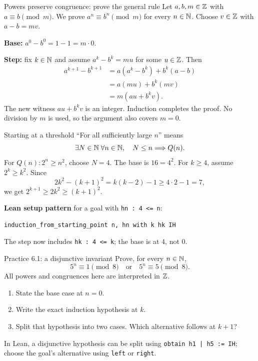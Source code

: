 \begin{frame}{Powers preserve congruence: prove the general rule}
Let $a,b,m\in\mathbb{Z}$ with $a\equiv b\pmod m$. We prove
$a^n\equiv b^n\pmod m$ for every $n\in\mathbb{N}$.
Choose $v\in\mathbb{Z}$ with $a-b=mv$.

\textbf{Base:} $a^0-b^0=1-1=m\cdot0$.

\textbf{Step:} fix $k\in\mathbb{N}$ and assume $a^k-b^k=mu$ for some $u\in\mathbb{Z}$.
Then
\[
\begin{aligned}
 a^{k+1}-b^{k+1}
 &=a(a^k-b^k)+b^k(a-b)\\
 &=a(mu)+b^k(mv)\\
 &=m(au+b^kv).
\end{aligned}
\]
The new witness $au+b^kv$ is an integer. Induction completes the proof.
No division by $m$ is used, so the argument also covers $m=0$.
\end{frame}

\begin{frame}[fragile]{Starting at a threshold}
``For all sufficiently large $n$'' means
\[
 \exists N\in\mathbb{N}\;\forall n\in\mathbb{N},\quad N\le n\Longrightarrow Q(n).
\]
For $Q(n): 2^n\ge n^2$, choose $N=4$. The base is $16=4^2$.
For $k\ge4$, assume $2^k\ge k^2$. Since
\[
 2k^2-(k+1)^2=k(k-2)-1\ge4\cdot2-1=7,
\]
we get $2^{k+1}\ge2k^2\ge(k+1)^2$.

\textbf{Lean setup pattern} for a goal with \texttt{hn : 4 <= n}:
\begin{lstlisting}
induction_from_starting_point n, hn with k hk IH
\end{lstlisting}
The step now includes \texttt{hk : 4 <= k}; the base is at $4$, not $0$.
\end{frame}

\begin{frame}{Practice 6.1: a disjunctive invariant}
Prove, for every $n\in\mathbb{N}$,
\[
 5^n\equiv1\pmod8\quad\text{or}\quad5^n\equiv5\pmod8.
\]
All powers and congruences here are interpreted in $\mathbb{Z}$.
\begin{enumerate}
\item State the base case at $n=0$.
\item Write the exact induction hypothesis at $k$.
\item Split that hypothesis into two cases. Which alternative follows at $k+1$?
\end{enumerate}
In Lean, a disjunctive hypothesis can be split using
\texttt{obtain h1 | h5 := IH}; choose the goal's alternative using
\texttt{left} or \texttt{right}.
\end{frame}

